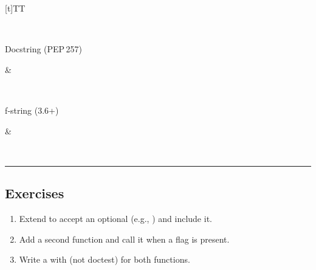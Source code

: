 \documentclass[a4paper,11pt,english]{sphinxmanual}
\begin{document}
\begin{savenotes}
\begin{tabulary}{\linewidth}[t]{TT}
\begin{varwidth}[t]{}
\end{varwidth}%
\\
\sphinxhline\begin{varwidth}[t]{}
\sphinxAtStartPar
Docstring (PEP 257)
\sphinxbeforeendvarwidth
\end{varwidth}%
&\begin{varwidth}[t]{}
\sphinxAtStartPar
{}
\sphinxbeforeendvarwidth
\end{varwidth}%
\\
\sphinxhline\begin{varwidth}[t]{}
\sphinxAtStartPar
f‑string (3.6+)
\sphinxbeforeendvarwidth
\end{varwidth}%
&\begin{varwidth}[t]{}
\sphinxAtStartPar
{}
\sphinxbeforeendvarwidth
\end{varwidth}%
\\
\sphinxbottomrule
\end{tabulary}
\sphinxtableafterendhook\par
\sphinxattableend\end{savenotes}


\bigskip\hrule\bigskip



\subsection{Exercises}
\label{\detokenize{getting_started/first_program:exercises}}\begin{enumerate}
%
\item {} 
\sphinxAtStartPar
Extend  to accept an optional  (e.g., ) and include it.

\item {} 
\sphinxAtStartPar
Add a second function  and call it when a  flag is present.

\item {} 
\sphinxAtStartPar
Write a  with  (not doctest) for both functions.

\end{enumerate}
\end{document}
